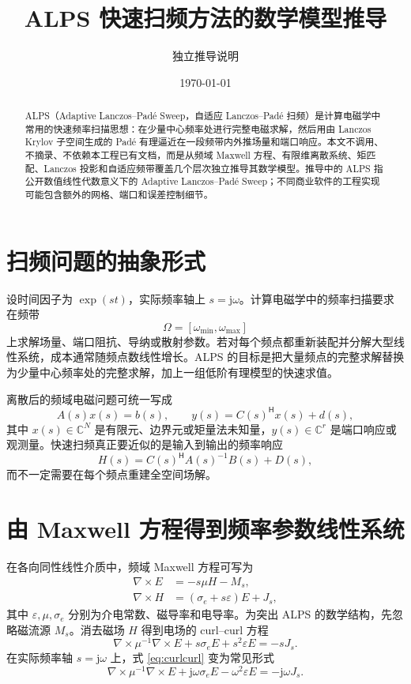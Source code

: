 \documentclass[UTF8,a4paper,11pt]{ctexart}
\title{ALPS 快速扫频方法的数学模型推导}
\author{独立推导说明}
\date{\today}
\newcommand{\jj}{\mathrm{j}}
\newcommand{\CC}{\mathbb{C}}
\newcommand{\herm}{\mathsf{H}}
\begin{document}
\maketitle

\begin{abstract}
ALPS（Adaptive Lanczos--Padé Sweep，自适应 Lanczos--Padé 扫频）是计算电磁学中常用的快速频率扫描思想：在少量中心频率处进行完整电磁求解，然后用由 Lanczos Krylov 子空间生成的 Padé 有理逼近在一段频带内外推场量和端口响应。本文不调用、不摘录、不依赖本工程已有文档，而是从频域 Maxwell 方程、有限维离散系统、矩匹配、Lanczos 投影和自适应频带覆盖几个层次独立推导其数学模型。推导中的 ALPS 指公开数值线性代数意义下的 Adaptive Lanczos--Padé Sweep；不同商业软件的工程实现可能包含额外的网格、端口和误差控制细节。
\end{abstract}

\tableofcontents

\section{扫频问题的抽象形式}

设时间因子为 $\exp(st)$，实际频率轴上 $s=\jj\omega$。计算电磁学中的频率扫描要求在频带
\[
    \Omega=[\omega_{\min},\omega_{\max}]
\]
上求解场量、端口阻抗、导纳或散射参数。若对每个频点都重新装配并分解大型线性系统，成本通常随频点数线性增长。ALPS 的目标是把大量频点的完整求解替换为少量中心频率处的完整求解，加上一组低阶有理模型的快速求值。

离散后的频域电磁问题可统一写成
\begin{equation}
    A(s)x(s)=b(s),\qquad y(s)=C(s)^{\herm}x(s)+d(s),
    \label{eq:full-system}
\end{equation}
其中 $x(s)\in\CC^N$ 是有限元、边界元或矩量法未知量，$y(s)\in\CC^r$ 是端口响应或观测量。快速扫频真正要近似的是输入到输出的频率响应
\begin{equation}
    H(s)=C(s)^{\herm}A(s)^{-1}B(s)+D(s),
    \label{eq:transfer-general}
\end{equation}
而不一定需要在每个频点重建全空间场解。

\section{由 Maxwell 方程得到频率参数线性系统}

在各向同性线性介质中，频域 Maxwell 方程可写为
\begin{align}
    \nabla\times E &= -s\mu H-M_s,\\
    \nabla\times H &= (\sigma_e+s\varepsilon)E+J_s,
\end{align}
其中 $\varepsilon,\mu,\sigma_e$ 分别为介电常数、磁导率和电导率。为突出 ALPS 的数学结构，先忽略磁流源 $M_s$。消去磁场 $H$ 得到电场的 curl--curl 方程
\begin{equation}
    \nabla\times\mu^{-1}\nabla\times E
    +s\sigma_e E+s^2\varepsilon E
    =-sJ_s .
    \label{eq:curlcurl}
\end{equation}
在实际频率轴 $s=\jj\omega$ 上，式 \eqref{eq:curlcurl} 变为常见形式
\[
    \nabla\times\mu^{-1}\nabla\times E
    +\jj\omega\sigma_e E-\omega^2\varepsilon E
    =-\jj\omega J_s .
\]
\end{document}
